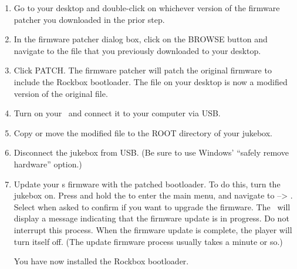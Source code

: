 \begin{enumerate}
  \item Go to your desktop and double-click on whichever version of the firmware 
  patcher you downloaded in the prior step.
  
  \item In the firmware patcher dialog box, click on the BROWSE button and navigate
  to the  file that you previously downloaded to your desktop.
  	
  \item Click PATCH. The firmware patcher will patch the original firmware to 
  include the Rockbox bootloader. The  file on your desktop is now
  a modified version of the original  file.
  
  \item Turn on your \playername\ and connect it to your computer via USB.
  
	\item Copy or move the modified  file to the ROOT directory of 
	your jukebox.

  \item Disconnect the jukebox from USB. (Be sure to use Windows' ``safely remove
  hardware'' option.)


	\item Update your \playername s firmware with the patched bootloader. To do this, turn 
	the jukebox on. Press and hold the 
	 to enter the main menu, and navigate to  --> . Select  when asked to confirm if you want to upgrade the 
	 firmware. The \playername\ will display a message indicating that the firmware update 
	 is in progress. Do not interrupt this process. When the firmware update is 
	 complete, the player will turn itself off. (The update firmware process usually 
	 takes a minute or so.)

You have now installed the Rockbox bootloader. 


\end{enumerate}